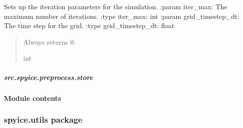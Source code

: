 \documentclass[a4paper,11pt,english,openany]{sphinxmanual}
\begin{document}

\begin{fulllineitems}
\label{\detokenize{api/spyice.preprocess.pre_process:src.spyice.preprocess.pre_process.set_up_iter}}
\pysigstartsignatures
\pysiglinewithargsret
{}
{\sphinxparamcomma {}}
{}
\pysigstopsignatures
\sphinxAtStartPar
Sets up the iteration parameters for the simulation.
:param iter\_max: The maximum number of iterations.
:type iter\_max: int
:param grid\_timestep\_dt: The time step for the grid.
:type grid\_timestep\_dt: float
\begin{quote}\begin{description}
\sphinxAtStartPar
Always returns 0.

\sphinxAtStartPar
int

\end{description}\end{quote}

\end{fulllineitems}


\sphinxstepscope


\subparagraph{src.spyice.preprocess.store}
\label{\detokenize{api/spyice.preprocess.store:src-spyice-preprocess-store}}\label{\detokenize{api/spyice.preprocess.store::doc}}

\paragraph{Module contents}
\label{\detokenize{api/spyice.preprocess:module-src.spyice.preprocess}}\label{\detokenize{api/spyice.preprocess:module-contents}}
\sphinxstepscope


\subsubsection{spyice.utils package}
\label{\detokenize{api/spyice.utils:spyice-utils-package}}\label{\detokenize{api/spyice.utils::doc}}
\end{document}
